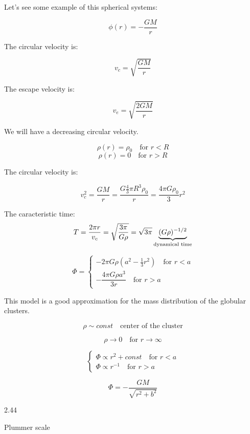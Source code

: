 Let's see some example of this spherical systems:

\begin{exampleblock}
    $$
    \phi(r) = - \dfrac{G M}{r}
    $$

    The circular velocity is: 
    
    $$
    v_c = \sqrt{\dfrac{G M}{r}}
    $$

    The escape velocity is:
    
    $$
    v_e = \sqrt{\dfrac{2 G M}{r}}
    $$

    We will have a decreasing circular velocity.
\end{exampleblock}

\begin{exampleblock}
    $$
    \rho(r) = \rho_0 \quad \text{for } r < R
    $$
    $$
    \rho(r) = 0 \quad \text{for } r > R
    $$
    
    The circular velocity is:
    
    $$
    v_c^2 = \dfrac{G M}{r} = 
            \dfrac{G \frac 43 \pi R^3 \rho_0}{r} = 
            \dfrac{4 \pi G \rho_0}{3} r^2
    $$

    The caracteristic time: 
    $$
    T = \dfrac{2\pi r}{v_c} = \sqrt{\dfrac{3\pi}{G \rho}} = \sqrt{3 \pi} \underbrace{(G \rho)^{-1/2}}_{\footnotesize{\text{dynamical time}}}
    $$


    $$
    \Phi = \begin{cases}
        - 2 \pi G \rho (a^2 - \frac 13 r^2) \quad \text{for } r < a\\
        - \dfrac{4 \pi G \rho a^3}{3r} \quad \text{for } r > a
    \end{cases}
    $$
\end{exampleblock}

\begin{exampleblock}

    This model is a good approximation for the mass distribution of the globular clusters.

    $$
    \rho \sim const \quad \text{center of the cluster}
    $$

    $$
    \rho \to 0 \quad \text{for } r \to \infty
    $$

    $$
    \begin{cases}
        \Phi \propto r^2 + const \quad \text{for } r < a\\
        \Phi \propto r^{-1} \quad \text{for } r > a
    \end{cases}
    $$

    $$
    \Phi = - \dfrac{G M}{\sqrt{r^2 + b^2}}
    $$

    2.44

    Plummer scale

\end{exampleblock}

